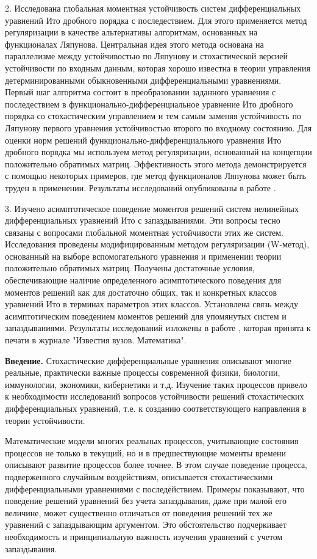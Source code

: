 2. Исследована глобальная моментная устойчивость систем
дифференциальных уравнений Ито дробного порядка с последествием. Для
этого применяется метод регуляризации в качестве альтернативы
алгоритмам, основанных на функционалах Ляпунова. Центральная идея
этого метода основана на параллелизме между устойчивостью по
Ляпунову и стохастической версией устойчивости по входным данным,
которая хорошо известна в теории управления детерминированными
обыкновенными дифференциальными уравнениями. Первый шаг алгоритма
состоит в преобразовании заданного уравнения с последествием в
функционально-дифференциальное уравнение Ито дробного порядка со
стохастическим управлением и тем самым заменяя устойчивость по
Ляпунову первого уравнения устойчивостью  второго по входному
состоянию. Для оценки норм решений функционально-дифференциального
уравнения Ито дробного порядка мы используем метод регуляризации,
основанный на концепции положительно обратимых матриц. Эффективность
этого метода демонстрируется с помощью некоторых примеров, где метод
функционалов Ляпунова может быть труден в применении. Результаты
исследований  опубликованы в работе \cite{bib:kad-3}.
\smallskip

3. Изучено  асимптотическое поведение моментов решений систем
нелинейных дифференциальных уравнений Ито с запаздываниями. Эти
вопросы тесно связаны с вопросами глобальной моментная устойчивости
этих же систем. Исследования проведены модифицированным методом
регуляризации (W-метод), основанный на выборе вспомогательного
уравнения и применении теории положительно обратимых матриц.
Получены достаточные условия, обеспечивающие наличие определенного
асимптотического поведения для моментов решений как для достаточно
общих, так и конкретных классов уравнений Ито в терминах параметров
этих классов. Установлена связь между асимптотическим поведением
моментов решений для упомянутых систем и запаздываниями. Результаты
исследований  изложены в работе \cite{bib:kad-4}, которая принята к печати в
журнале "Известия вузов. Математика".
\smallskip


\textbf{Введение.} Стохастические дифференциальные уравнения
описывают многие реальные, практически важные процессы современной
физики, биологии, иммунологии, экономики, кибернетики и т.д.
Изучение таких процессов привело к необходимости исследований
вопросов устойчивости решений стохастических дифференциальных
уравнений, т.е. к созданию соответствующего направления в теории
устойчивости.

Математические модели многих реальных процессов, учитывающие
состояния процессов не только в текущий, но и в предшествующие
моменты времени описывают развитие процессов более точнее. В этом
случае поведение процесса, подверженного случайным воздействиям,
описывается стохастическими дифференциальными уравнениями с
последействием. Примеры показывают, что поведение решений уравнений
без учета запаздывания, даже при малой его величине, может
существенно отличаться от поведения решений тех же уравнений с
запаздывающим аргументом. Это обстоятельство подчеркивает
необходимость и принципиальную важность изучения уравнений с учетом
запаздывания.

